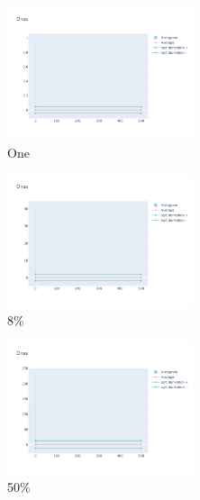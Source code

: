 \documentclass[12pt, fleqn]{report}                             %
\theoremstyle{break}                                            %
\begin{document}
      \begin{figure}[ht!]
        \centering
        \begin{subfigure}[b]{0.4\linewidth}
          \includegraphics[width=0.6\textwidth]{Images/160/dia-a.png}
          \caption{One}
        \end{subfigure}
        \begin{subfigure}[b]{0.4\linewidth}
          \includegraphics[width=0.6\textwidth]{Images/160/dia-b.png}
          \caption{8\%}
        \end{subfigure}
        \begin{subfigure}[b]{0.4\linewidth}
          \includegraphics[width=0.6\textwidth]{Images/160/dia-c.png}
          \caption{50\%}
        \end{subfigure}
        \begin{subfigure}[b]{0.4\linewidth}

\end{subfigure}
\end{figure}
\end{document}
